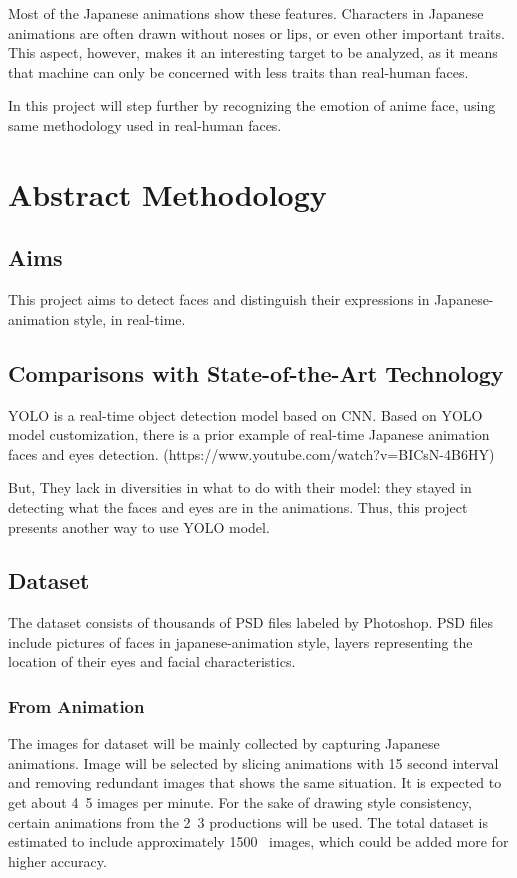 \documentclass{article}
\begin{document}
Most of the Japanese animations show these features. Characters in Japanese animations are often drawn without noses or lips, or even other important traits. This aspect, however, makes it an interesting target to be analyzed, as it means that machine can only be concerned with less traits than real-human faces.

In this project will step further by recognizing the emotion of anime face, using same methodology used in real-human faces.


\section{Abstract Methodology}

\subsection{Aims}

This project aims to detect faces and distinguish their expressions in Japanese-animation style, in real-time.

\subsection{Comparisons with State-of-the-Art Technology}

YOLO is a real-time object detection model based on CNN.
Based on YOLO model customization, there is a prior example of real-time Japanese animation faces and eyes detection. (https://www.youtube.com/watch?v=BICsN-4B6HY)

But, They lack in diversities in what to do with their model: they stayed in detecting what the faces and eyes are in the animations.
Thus, this project presents another way to use YOLO model.


\subsection{Dataset}

The dataset consists of thousands of PSD files labeled by Photoshop. PSD files include pictures of faces in japanese-animation style, layers representing the location of their eyes and facial characteristics.

\subsubsection{From Animation}
The images for dataset will be mainly collected by capturing Japanese animations.
Image will be selected by slicing animations with 15 second interval and removing redundant images that shows the same situation. It is expected to get about 4~5 images per minute.
For the sake of drawing style consistency, certain animations from the 2~3 productions will be used. The total dataset is estimated to include approximately 1500~ images, which could be added more for higher accuracy.
\end{document}
